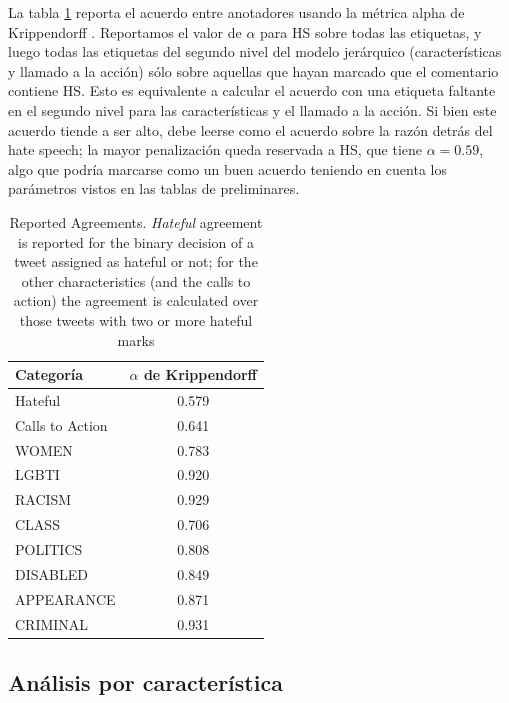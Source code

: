La tabla \ref{tab:annotation_agreement} reporta el acuerdo entre anotadores usando la métrica alpha de Krippendorff . Reportamos el valor de $\alpha$ para HS sobre todas las etiquetas, y luego todas las etiquetas del segundo nivel del modelo jerárquico (características y llamado a la acción) sólo sobre aquellas que hayan marcado que el comentario contiene HS. Esto es equivalente a calcular el acuerdo con una etiqueta faltante en el segundo nivel para las características y el llamado a la acción. Si bien este acuerdo tiende a ser alto, debe leerse como el acuerdo sobre la razón detrás del hate speech; la mayor penalización queda reservada a HS, que tiene $\alpha = 0.59$, algo que podría marcarse como un buen acuerdo teniendo en cuenta los parámetros vistos en las tablas de preliminares. 

\begin{table}
    \centering
    \begin{tabular}{lc}
        \toprule
        Categoría   & $\alpha$ de Krippendorff \\
        \midrule
        Hateful              &  0.579 \\
        Calls to Action      &  0.641 \\
        \midrule
        WOMEN                &  0.783 \\
        LGBTI                &  0.920 \\
        RACISM               &  0.929 \\
        CLASS                &  0.706 \\
        POLITICS             &  0.808 \\
        DISABLED             &  0.849 \\
        APPEARANCE           &  0.871 \\
        CRIMINAL             &  0.931 \\
        \bottomrule
    \end{tabular}
    \caption{Reported Agreements. \emph{Hateful} agreement is reported for the binary decision of a tweet assigned as hateful or not; for the other characteristics (and the calls to action) the agreement is calculated over those tweets with two or more hateful marks}
    \label{tab:annotation_agreement}
\end{table}

\subsection{Análisis por característica}

